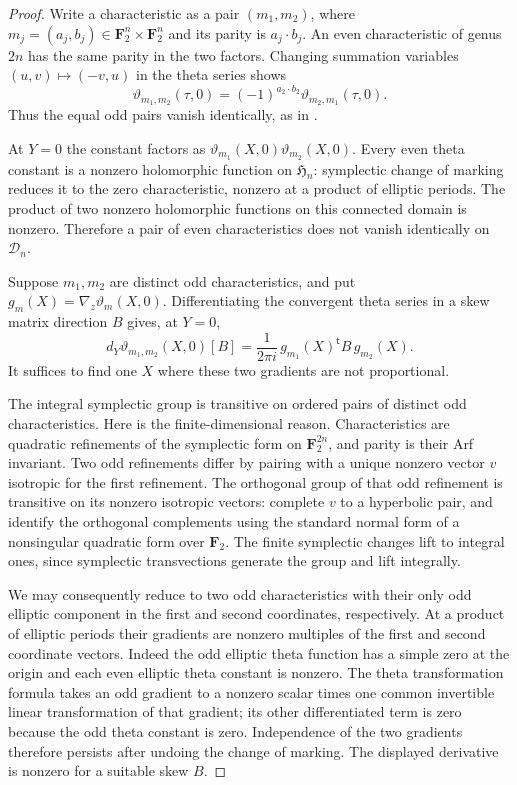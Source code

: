 \documentclass[11pt]{article}
\theoremstyle{definition}
\theoremstyle{remark}
\begin{document}
\begin{proof}
Write a characteristic as a pair $(m_1,m_2)$, where
$m_j=(a_j,b_j)\in\mathbf F_2^n\times\mathbf F_2^n$ and its parity is
$a_j\cdot b_j$. An even characteristic of genus $2n$ has the same
parity in the two factors. Changing summation variables
$(u,v)\mapsto(-v,u)$ in the theta series shows
\[
 \vartheta_{m_1,m_2}(\tau,0)
   =(-1)^{a_2\cdot b_2}\vartheta_{m_2,m_1}(\tau,0).
\]
Thus the equal odd pairs vanish identically, as in
\cite[Lemma~2.3]{vG96}.

At $Y=0$ the constant factors as
$\vartheta_{m_1}(X,0)\vartheta_{m_2}(X,0)$.
Every even theta constant is a nonzero holomorphic function on
$\mathfrak H_n$: symplectic change of marking reduces it to the
zero characteristic, nonzero at a product of elliptic periods.
The product of two nonzero holomorphic functions on this connected
domain is nonzero. Therefore a pair of even characteristics does
not vanish identically on $\mathcal D_n$.

Suppose $m_1,m_2$ are distinct odd characteristics, and put
$g_m(X)=\nabla_z\vartheta_m(X,0)$.
Differentiating the convergent theta series in a skew matrix
direction $B$ gives, at $Y=0$,
\[
 d_Y\vartheta_{m_1,m_2}(X,0)[B]
   =\frac{1}{2\pi i}\,g_{m_1}(X)^{\mathsf t}B\,g_{m_2}(X).
\]
It suffices to find one $X$ where these two gradients are not
proportional.

The integral symplectic group is transitive on ordered pairs of
distinct odd characteristics. Here is the finite-dimensional reason.
Characteristics are quadratic refinements of the symplectic form
on $\mathbf F_2^{2n}$, and parity is their Arf invariant.
Two odd refinements differ by pairing with a unique nonzero vector
$v$ isotropic for the first refinement. The orthogonal group of
that odd refinement is transitive on its nonzero isotropic vectors:
complete $v$ to a hyperbolic pair, and identify the orthogonal
complements using the standard normal form of a nonsingular
quadratic form over $\mathbf F_2$. The finite symplectic changes
lift to integral ones, since symplectic transvections generate
the group and lift integrally.

We may consequently reduce to two odd characteristics with their
only odd elliptic component in the first and second coordinates,
respectively. At a product of elliptic periods their gradients
are nonzero multiples of the first and second coordinate vectors.
Indeed the odd elliptic theta function has a simple zero at the
origin and each even elliptic theta constant is nonzero.
The theta transformation formula takes an odd gradient to a
nonzero scalar times one common invertible linear transformation
of that gradient; its other differentiated term is zero because
the odd theta constant is zero. Independence of the two gradients
therefore persists after undoing the change of marking.
The displayed derivative is nonzero for a suitable skew $B$.


\end{proof}
\end{document}
